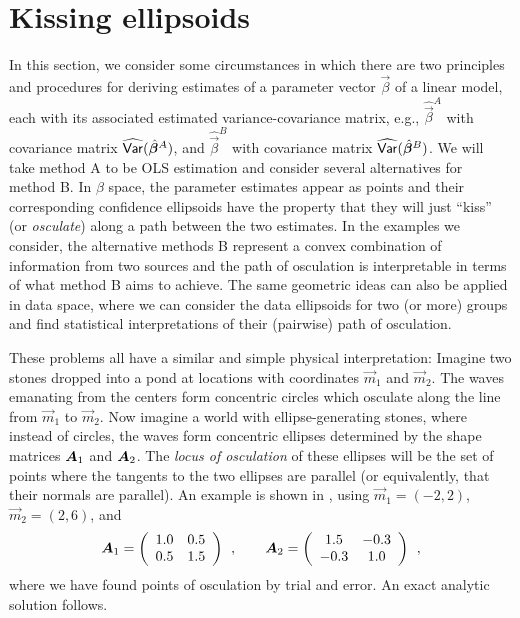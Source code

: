%
\section{Kissing ellipsoids}

In this section, we consider some circumstances in which there are two
principles and procedures for deriving estimates of a parameter vector $\vec{\beta}$
of a linear model,
each with its associated estimated variance-covariance matrix, e.g.,
$\widehat{\vec{\beta}}^A$ with covariance matrix $\widehat{\mathsf{Var}}(\hat{\bm{\beta}}^A)$,
and
$\widehat{\vec{\beta}}^B$ with covariance matrix $\widehat{\mathsf{Var}}(\hat{\bm{\beta}}^B)$.
We will take method A to be OLS estimation and consider several alternatives
for method B.  In $\beta$ space, the parameter estimates appear as points and their
corresponding confidence ellipsoids have the property that they will just ``kiss''
(or \emph{osculate}) along a path between the two estimates.
In the examples we consider, the alternative methods B represent a convex combination
of information from two sources and the path of osculation is interpretable in
terms of what method B aims to achieve.
The same geometric ideas can also be applied in data space, where we can consider
the data ellipsoids for two (or more) groups and find statistical interpretations of
their (pairwise) path of osculation.

These problems all have a similar and simple physical interpretation:  Imagine two stones dropped
into a pond at locations with coordinates $\vec{m}_1$ and $\vec{m}_2$.  The waves emanating from the centers
form concentric circles which osculate along the line from $\vec{m}_1$ to $\vec{m}_2$.
Now imagine a world with ellipse-generating stones, where instead of circles, the waves form concentric ellipses determined by
the shape matrices $\bm{A}_1$ and $\bm{A}_2$.
The \emph{locus of osculation} of these ellipses will be the set of points where the tangents
to the two ellipses are parallel (or equivalently, that their normals are parallel).  An
example is shown in , using $\vec{m}_1 = (-2, 2)$, $\vec{m}_2 = (2, 6)$, and
\begin{equation} \label{eq:kiss-demoA}
\bm{A}_1 = \left(
\begin{array}{cc}
 1.0 & 0.5 \\ 0.5 & 1.5
\end{array}
\right)
\:\: ,\quad\quad
\bm{A}_2 =\left(
\begin{array}{cc}
 1.5 & -0.3 \\ -0.3 & 1.0
\end{array}
\right) \:\: ,
\end{equation}
where we have found points of osculation by trial and error.  An exact analytic solution follows.

